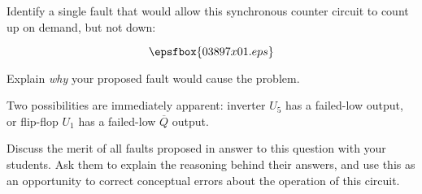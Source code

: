 

Identify a single fault that would allow this synchronous counter circuit to count up on demand, but not down:

$$\epsfbox{03897x01.eps}$$

Explain {\it why} your proposed fault would cause the problem.







Two possibilities are immediately apparent: inverter $U_5$ has a failed-low output, or flip-flop $U_1$ has a failed-low $\overline{Q}$ output.







Discuss the merit of all faults proposed in answer to this question with your students.  Ask them to explain the reasoning behind their answers, and use this as an opportunity to correct conceptual errors about the operation of this circuit.




